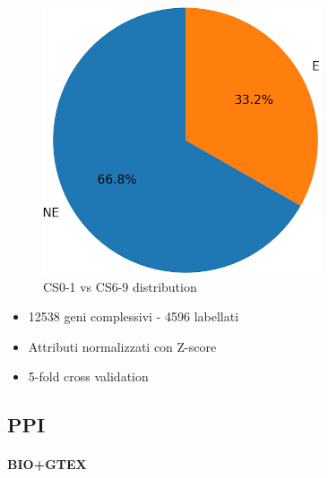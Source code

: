 \documentclass[
]{article}
\providecommand{\tightlist}{%
  \setlength{\itemsep}{0pt}\setlength{\parskip}{0pt}}
\begin{document}
\begin{figure}
\centering
\includegraphics{figures/cs01_69.png}
\caption{CS0-1 vs CS6-9 distribution}
\end{figure}

\begin{itemize}
\tightlist
\item
  12538 geni complessivi - 4596 labellati
\item
  Attributi normalizzati con Z-score
\item
  5-fold cross validation
\end{itemize}

\hypertarget{ppi-1}{%
\subsection{PPI}\label{ppi-1}}

\hypertarget{biogtex-3}{%
\paragraph{BIO+GTEX}\label{biogtex-3}}
\end{document}
